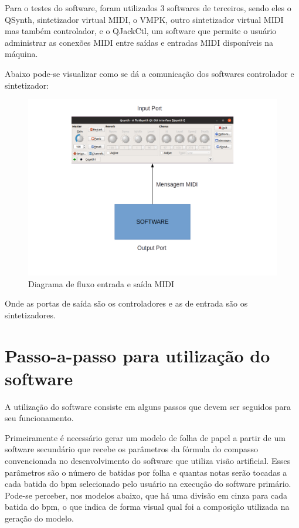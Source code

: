 \documentclass[12pt]{report}
\begin{document}
{Para o testes do software, foram utilizados 3 softwares de terceiros, sendo eles o QSynth, sintetizador virtual MIDI, o VMPK, outro sintetizador virtual MIDI mas também controlador, e o QJackCtl, um software que permite o usuário administrar as conexões MIDI entre saídas e entradas MIDI disponíveis na máquina.

Abaixo pode-se visualizar como se dá a comunicação dos softwares controlador e sintetizador:

\begin{figure}[H]
  \centering
  \includegraphics[width=1\textwidth]{imagens/Diagrama2.png}
  \caption{Diagrama de fluxo entrada e saída MIDI}
  \label{fig:diagrama}
\end{figure}

Onde as portas de saída são os controladores e as de entrada são os sintetizadores.



\chapter{Passo-a-passo para utilização do software}
A utilização do software consiste em alguns passos que devem ser seguidos para seu funcionamento.

Primeiramente é necessário gerar um modelo de folha de papel a partir de um software secundário que recebe os parâmetros da fórmula do compasso convencionada no desenvolvimento do software que utiliza visão artificial. Esses parâmetros são o número de batidas por folha e quantas notas serão tocadas a cada batida do bpm selecionado pelo usuário na execução do software primário. Pode-se perceber, nos modelos abaixo, que há uma divisão em cinza para cada batida do bpm, o que indica de forma visual qual foi a composição utilizada na geração do modelo.

}
\end{document}

